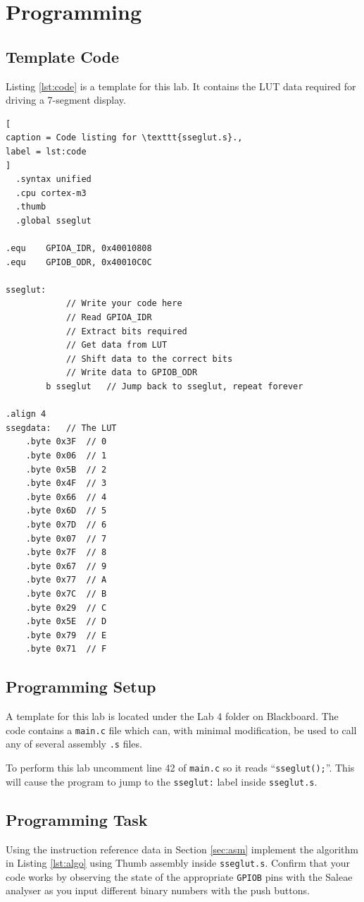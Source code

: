 \documentclass{UoNMCHA}
\numberwithin{equation}{section}
\begin{document}
\section{Programming}

\subsection{Template Code}

Listing \ref{lst:code} is a template for this lab. It contains the LUT data required for driving a 7-segment display.

\begin{lstlisting}[
caption = Code listing for \texttt{sseglut.s}.,
label = lst:code
]
  .syntax unified
  .cpu cortex-m3
  .thumb
  .global sseglut

.equ    GPIOA_IDR, 0x40010808
.equ	GPIOB_ODR, 0x40010C0C

sseglut:
            // Write your code here
            // Read GPIOA_IDR
            // Extract bits required
            // Get data from LUT
            // Shift data to the correct bits
            // Write data to GPIOB_ODR
        b sseglut   // Jump back to sseglut, repeat forever
            
.align 4
ssegdata:   // The LUT
    .byte 0x3F  // 0
    .byte 0x06  // 1
    .byte 0x5B  // 2
    .byte 0x4F  // 3
    .byte 0x66  // 4
    .byte 0x6D  // 5
    .byte 0x7D  // 6
    .byte 0x07  // 7
    .byte 0x7F  // 8
    .byte 0x67  // 9
    .byte 0x77  // A
    .byte 0x7C  // B
    .byte 0x29  // C
    .byte 0x5E  // D
    .byte 0x79  // E
    .byte 0x71  // F
\end{lstlisting}

\subsection{Programming Setup}

A template for this lab is located under the Lab 4 folder on Blackboard. The code contains a \texttt{main.c} file which can, with minimal modification, be used to call any of several assembly \texttt{.s} files.

To perform this lab uncomment line 42 of \texttt{main.c} so it reads ``\texttt{sseglut();}''. This will cause the program to jump to the \texttt{sseglut:} label inside \texttt{sseglut.s}.

\subsection{Programming Task}
Using the instruction reference data in Section \ref{sec:asm} implement the algorithm in Listing \ref{lst:algo} using Thumb assembly inside \texttt{sseglut.s}. Confirm that your code works by observing the state of the appropriate \texttt{GPIOB} pins with the Saleae analyser as you input different binary numbers with the push buttons.
\end{document}
